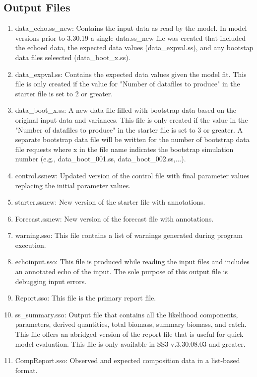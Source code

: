 	\subsection{Output Files}
	\begin{enumerate}
		\item data\_echo.ss\_new: Contains the input data as read by the model. In model versions prior to 3.30.19 a single data.ss\_new file was created that included the echoed data, the expected data values (data\_expval.ss), and any bootstap data files seleected (data\_boot\_x.ss).
		\item data\_expval.ss: Contains the expected data values given the model fit. This file is only created if the value for "Number of datafiles to produce" in the starter file is set to 2 or greater.
		\item data\_boot\_x.ss: A new data file filled with bootstrap data based on the original input data and variances. This file is only created if the value in the "Number of datafiles to produce" in the starter file is set to 3 or greater. A separate bootstrap data file will be written for the number of bootstrap data file requests where x in the file name indicates the bootstrap simulation number (e.g., data\_boot\_001.ss, data\_boot\_002.ss,...).
		\item control.ss\textunderscore new: Updated version of the control file with final parameter values replacing the initial parameter values.
		\item starter.ss\textunderscore new: New version of the starter file with annotations.
		\item Forecast.ss\textunderscore new: New version of the forecast file with annotations.
		\item warning.sso: This file contains a list of warnings generated during program execution.
		\item echoinput.sso: This file is produced while reading the input files and includes an annotated echo of the input. The sole purpose of this output file is debugging input errors.
		\item Report.sso: This file is the primary report file.
		\item ss\_summary.sso: Output file that contains all the likelihood components, parameters, derived quantities, total biomass, summary biomass, and catch. This file offers an abridged version of the report file that is useful for quick model evaluation. This file is only available in SS3 v.3.30.08.03 and greater.
		\item CompReport.sso: Observed and expected composition data in a list-based format.

\end{enumerate}
